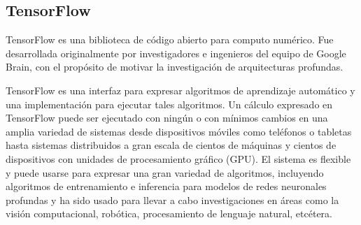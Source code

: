 


\subsection{TensorFlow}

TensorFlow es una biblioteca de código abierto para computo numérico. Fue desarrollada 
originalmente por investigadores e ingenieros del equipo de Google Brain, con 
el propósito de motivar la investigación de arquitecturas profundas.

TensorFlow es una interfaz para expresar algoritmos de aprendizaje automático
y una implementación para ejecutar tales algoritmos.
Un cálculo expresado en TensorFlow puede ser ejecutado con ningún o con mínimos
cambios en una amplia variedad de sistemas desde dispositivos móviles
como teléfonos o tabletas hasta sistemas distribuidos a gran escala
de cientos de máquinas y cientos de dispositivos con unidades de procesamiento 
gráfico (GPU). El sistema es flexible y puede usarse para expresar una gran 
variedad de algoritmos, incluyendo algoritmos de entrenamiento
e inferencia para modelos de redes neuronales profundas y ha sido usado
para llevar a cabo investigaciones en áreas como la visión computacional,
robótica, procesamiento de lenguaje natural, etcétera.\\ 

